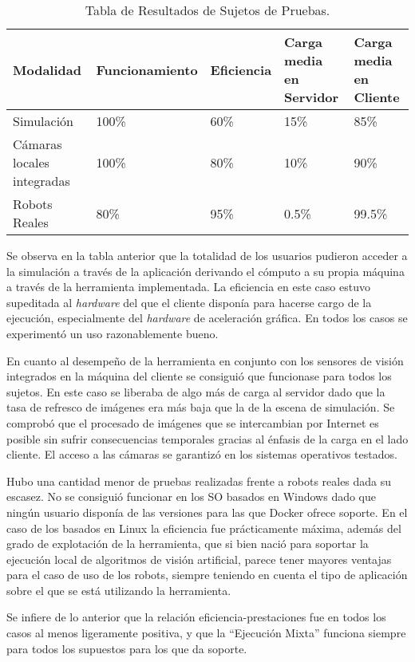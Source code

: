 \begin{table}[htbp]
\begin{center}
\begin{tabular}{| p{1.8cm}| p{2.6cm} | p{1.7cm}| p{2.4cm}| p{3cm}|}
\hline
Modalidad & Funcionamiento & Eficiencia & Carga media en Servidor & Carga media en Cliente \\
\hline \hline
Simulación & 100\% & 60\% & 15\% & 85\%\\ \hline
Cámaras locales integradas & 100\% & 80\% & 10\% & 90\%\\ \hline
Robots Reales & 80\% & 95\% & 0.5\% & 99.5\%\\ \hline
\end{tabular}
\caption{Tabla de Resultados de Sujetos de Pruebas.}
\label{tabla:pros_cons}
\end{center}
\end{table}

Se observa en la tabla anterior que la totalidad de los usuarios pudieron acceder a la simulación a través de la aplicación derivando el cómputo a su propia máquina a través de la herramienta implementada. La eficiencia en este caso estuvo supeditada al \textit{hardware} del que el cliente disponía para hacerse cargo de la ejecución, especialmente del \textit{hardware} de aceleración gráfica. En todos los casos se experimentó un uso razonablemente bueno.

En cuanto al desempeño de la herramienta en conjunto con los sensores de visión integrados en la máquina del cliente se consiguió que funcionase para todos los sujetos. En este caso se liberaba de algo más de carga al servidor dado que la tasa de refresco de imágenes era más baja que la de la escena de simulación. Se comprobó que el procesado de imágenes que se intercambian por Internet es posible sin sufrir consecuencias temporales gracias al énfasis de la carga en el lado cliente. El acceso a las cámaras se garantizó en los sistemas operativos testados.

Hubo una cantidad menor de pruebas realizadas frente a robots reales dada su escasez. No se consiguió funcionar en los SO basados en Windows dado que ningún usuario disponía de las versiones para las que Docker ofrece soporte. En el caso de los basados en Linux la eficiencia fue prácticamente máxima, además del grado de explotación de la herramienta, que si bien nació para soportar la ejecución local de algoritmos de visión artificial, parece tener mayores ventajas para el caso de uso de los robots, siempre teniendo en cuenta el tipo de aplicación sobre el que se está utilizando la herramienta. 

Se infiere de lo anterior que la relación eficiencia-prestaciones fue en todos los casos al menos ligeramente positiva, y que la ``Ejecución Mixta'' funciona siempre para todos los supuestos para los que da soporte.

